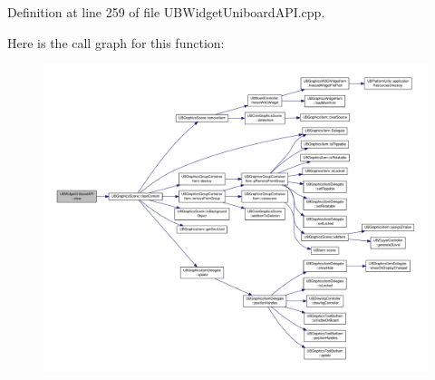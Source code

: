 Definition at line 259 of file U\-B\-Widget\-Uniboard\-A\-P\-I.\-cpp.



Here is the call graph for this function\-:
\nopagebreak
\begin{figure}[H]
\begin{center}
\leavevmode
\includegraphics[width=350pt]{d5/d2b/class_u_b_widget_uniboard_a_p_i_a4c4dd082d6ed9397e4658a41f78638f5_cgraph}
\end{center}
\end{figure}


